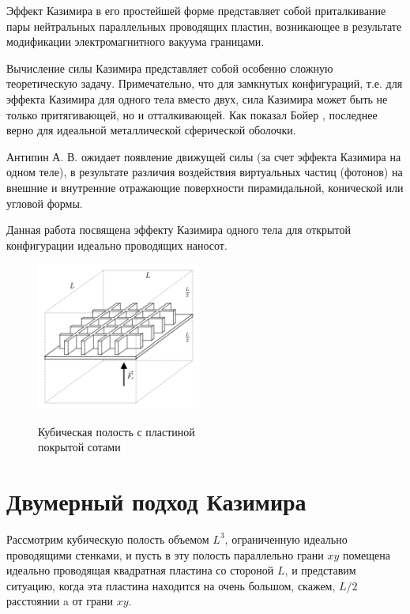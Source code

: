 \documentclass[11pt]{article}
\begin{document}
Эффект Казимира в его простейшей форме представляет собой приталкивание
пары нейтральных параллельных проводящих пластин, возникающее в
результате модификации электромагнитного вакуума границами.

Вычисление силы Казимира представляет собой особенно сложную
теоретическую задачу. Примечательно, что для замкнутых конфигураций,
т.е. для эффекта Казимира для одного тела вместо двух, сила Казимира
может быть не только притягивающей, но и отталкивающей. Как показал
Бойер \cite{Boyer1968}, последнее верно для идеальной металлической
сферической оболочки.

Антипин А. В. \cite{Antipin2012} ожидает появление движущей силы
(за счет эффекта Казимира на одном теле), в результате различия
воздействия виртуальных частиц (фотонов) на внешние и внутренние
отражающие поверхности пирамидальной, конической или угловой формы.

Данная работа посвящена эффекту Казимира одного тела для открытой
конфигурации идеально проводящих наносот.

    \begin{figure}
\begin{center}
\includegraphics[width=0.48\textwidth]{honeycomb_box_L.png}
\caption{}{Кубическая полость с пластиной \\ покрытой сотами}
\end{center}
\label{fig:honeycomb_box_L}
\end{figure}

    \section{Двумерный подход
Казимира}\label{ux434ux432ux443ux43cux435ux440ux43dux44bux439-ux43fux43eux434ux445ux43eux434-ux43aux430ux437ux438ux43cux438ux440ux430}

    Рассмотрим кубическую полость объемом \(L^3\), ограниченную идеально
проводящими стенками, и пусть в эту полость параллельно грани \(xy\)
помещена идеально проводящая квадратная пластина со стороной \(L\), и
представим ситуацию, когда эта пластина находится на очень большом,
скажем, \(L/2\) расстоянии a от грани \(xy\).
\end{document}
